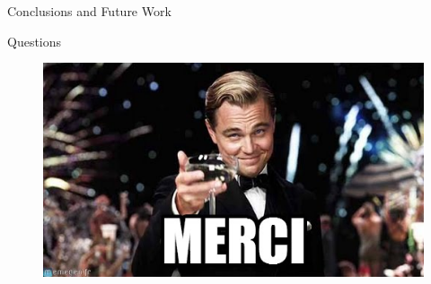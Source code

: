 \documentclass[]{beamer}
\begin{document}
\begin{frame}{Conclusions and Future Work}
  
\end{frame}

\begin{frame}{Questions}
  \begin{figure}[ht]
    \centering
    \includegraphics[width=\textwidth,height=0.8\textheight,keepaspectratio]{figures/merci.jpg}
  \end{figure}
\end{frame}
\end{document}
